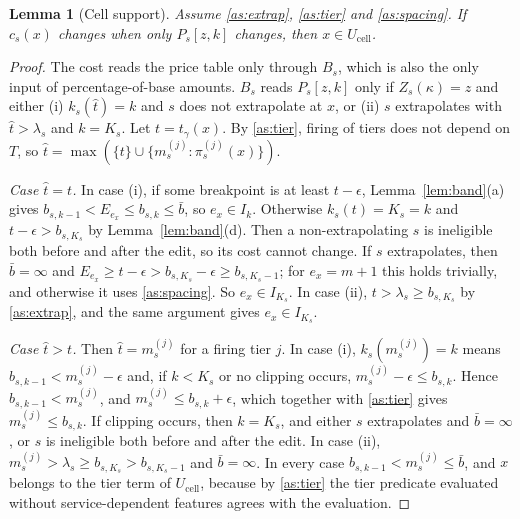 \documentclass[11pt]{article}
\newtheorem{lemma}[theorem]{Lemma}
\theoremstyle{definition}
\theoremstyle{remark}
\begin{document}
\begin{lemma}[Cell support]\label{lem:cellsupport}
Assume \ref{as:extrap}, \ref{as:tier} and \ref{as:spacing}. If $c_s(x)$ changes when only
$P_s[z,k]$ changes, then $x\in U_{\mathrm{cell}}$.
\end{lemma}
\begin{proof}
The cost reads the price table only through $B_s$, which is also the only input of
percentage-of-base amounts. $B_s$ reads $P_s[z,k]$ only if $Z_s(\kappa)=z$ and either (i)
$k_s(\hat t)=k$ and $s$ does not extrapolate at $x$, or (ii) $s$ extrapolates with
$\hat t>\lambda_s$ and $k=K_s$. Let $t=t_\gamma(x)$. By \ref{as:tier}, firing of tiers does not
depend on $T$, so $\hat t=\max(\{t\}\cup\{m^{(j)}_s:\pi^{(j)}_s(x)\})$.

\emph{Case $\hat t=t$.} In case (i), if some breakpoint is at least $t-\epsilon$,
Lemma~\ref{lem:band}(a) gives $b_{s,k-1}<E_{e_x}\le b_{s,k}\le\bar b$, so $e_x\in I_k$.
Otherwise $k_s(t)=K_s=k$ and $t-\epsilon>b_{s,K_s}$ by Lemma~\ref{lem:band}(d). Then a
non-extrapolating $s$ is ineligible both before and after the edit, so its cost cannot
change. If $s$ extrapolates, then $\bar b=\infty$ and $E_{e_x}\ge t-\epsilon>b_{s,K_s}-\epsilon\ge
b_{s,K_s-1}$; for $e_x=m+1$ this holds trivially, and otherwise it uses \ref{as:spacing}. So
$e_x\in I_{K_s}$. In case (ii), $t>\lambda_s\ge b_{s,K_s}$ by \ref{as:extrap}, and the same
argument gives $e_x\in I_{K_s}$.

\emph{Case $\hat t>t$.} Then $\hat t=m^{(j)}_s$ for a firing tier $j$. In case (i),
$k_s(m^{(j)}_s)=k$ means $b_{s,k-1}<m^{(j)}_s-\epsilon$ and, if $k<K_s$ or no clipping occurs,
$m^{(j)}_s-\epsilon\le b_{s,k}$. Hence $b_{s,k-1}<m^{(j)}_s$, and $m^{(j)}_s\le b_{s,k}+\epsilon$,
which together with \ref{as:tier} gives $m^{(j)}_s\le b_{s,k}$. If clipping occurs, then
$k=K_s$, and either $s$ extrapolates and $\bar b=\infty$, or $s$ is ineligible both before
and after the edit. In case (ii), $m^{(j)}_s>\lambda_s\ge b_{s,K_s}>b_{s,K_s-1}$ and
$\bar b=\infty$. In every case $b_{s,k-1}<m^{(j)}_s\le\bar b$, and $x$ belongs to the tier
term of $U_{\mathrm{cell}}$, because by \ref{as:tier} the tier predicate evaluated without
service-dependent features agrees with the evaluation.
\end{proof}
\end{document}
